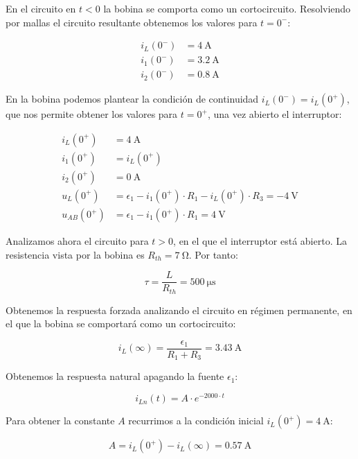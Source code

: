 En el circuito en $t <0$ la bobina se comporta como un
cortocircuito. Resolviendo por mallas el circuito resultante obtenemos
los valores para $t = 0^-$:

\begin{align*}
  i_L(0^-) &= \qty{4}{\ampere}\\
  i_1(0^-) &= \qty{3.2}{\ampere}\\
  i_2(0^-) &= \qty{0.8}{\ampere}
\end{align*}

En la bobina podemos plantear la condición de continuidad
$i_L(0^-) = i_L(0^+)$, que nos permite obtener los valores para
$t = 0^+$, una vez abierto el interruptor:

\begin{align*}
  i_L(0^+) &= \qty{4}{\ampere}\\
  i_1(0^+) &= i_L(0^+)\\
  i_2(0^+) &= \qty{0}{\ampere}\\
  u_L(0^+) &= \epsilon_1 - i_1(0^+) \cdot R_1 - i_L(0^+) \cdot R_3 = -\qty{4}{\volt}\\
  u_{AB}(0^+) &= \epsilon_1 - i_1(0^+) \cdot R_1 = \qty{4}{\volt}
\end{align*}

Analizamos ahora el circuito para $t > 0$, en el que el interruptor
está abierto. La resistencia vista por la bobina es
$R_{th} = \qty{7}{\ohm}$. Por tanto:

\begin{equation*}
  \tau = \frac{L}{R_{th}} = \qty{500}{\micro\second}
\end{equation*}

Obtenemos la respuesta forzada analizando el circuito en régimen
permanente, en el que la bobina se comportará como un cortocircuito:

\begin{equation*}
  i_{L}(\infty) = \frac{\epsilon_1}{R_1 + R_3} = \qty{3.43}{\ampere}
\end{equation*}

Obtenemos la respuesta natural apagando la fuente $\epsilon_1$:

\begin{equation*}
  i_{Ln}(t) = A \cdot e^{-2000 \cdot t}
\end{equation*}

Para obtener la constante $A$ recurrimos a la condición inicial
$i_L(0^+) = \qty{4}{\ampere}$:

\begin{equation*}
  A = i_L(0^+) - i_L(\infty) = \qty{0.57}{\ampere}
\end{equation*}

